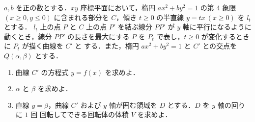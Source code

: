 \documentclass[../../main.tex]{subfiles}
\begin{document}
$a, b$ を正の数とする．$xy$ 座標平面において，楕円 $ax^2 + by^2 = 1$ の第 4 象限
$(x \ge 0, y \le 0)$ に含まれる部分を $C$，傾き $t \ge 0$ の半直線 $y = tx \ (x \ge 0)$ を $l_t$ とする．
$l_t$ 上の点 $P$ と $C$ 上の点 $P'$ を結ぶ線分 $PP'$ が $y$ 軸に平行になるように動くとき，線分
$PP'$ の長さを最大にする $P$ を $P_t$ で表し，$t \ge 0$ が変化するときに $P_t$ が描く曲線を $C'$ と
する．また，楕円 $ax^2 + by^2 = 1$ と $C'$ との交点を $Q(\alpha, \beta)$ とする．

\begin{enumerate}
  \item 曲線 $C'$ の方程式 $y = f(x)$ を求めよ．
  \item $\alpha$ と $\beta$ を求めよ．
  \item 直線 $y = \beta$，曲線 $C'$ および $y$ 軸が囲む領域を $D$ とする．$D$ を $y$ 軸の回りに $1$ 回
    回転してできる回転体の体積 $V$ を求めよ．
\end{enumerate}
\end{document}
